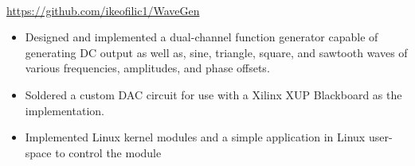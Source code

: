  \\
{\url{https://github.com/ikeofilic1/WaveGen}}
\begin{itemize}
    \item Designed and implemented a dual-channel function generator capable of generating DC output as well as, sine, triangle, square, and sawtooth waves of various frequencies, amplitudes, and phase offsets.
    \item Soldered a custom DAC circuit for use with a Xilinx XUP Blackboard as the implementation.
    \item Implemented Linux kernel modules and a simple application in Linux user-space to control the module
\end{itemize}
